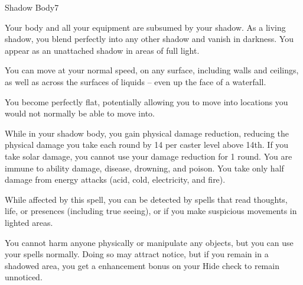 \begin{spellfooter}
\begin{spellsection}{Shadow Body}{7}
    \begin{spellheader}
        \begin{spelltargetinginfo}
        \end{spelltargetinginfo}
    \end{spellheader}
    \begin{spellcontent}
        \begin{spelleffects}
            \spelleffect Your body and all your equipment are subsumed by your shadow. As a living shadow, you blend perfectly into any other shadow and vanish in darkness. You appear as an unattached shadow in areas of full light.
            \par You can move at your normal speed, on any surface, including walls and ceilings, as well as across the surfaces of liquids -- even up the face of a waterfall.
            \par You become perfectly flat, potentially allowing you to move into locations you would not normally be able to move into.
            \par While in your shadow body, you gain physical damage reduction, reducing the physical damage you take each round by 14  per caster level above 14th. If you take solar damage, you cannot use your damage reduction for 1 round. You are immune to ability damage, disease, drowning, and poison. You take only half damage from energy attacks (acid, cold, electricity, and fire).
            \par While affected by this spell, you can be detected by spells that read thoughts, life, or presences (including true seeing), or if you make suspicious movements in lighted areas.
            \par You cannot harm anyone physically or manipulate any objects, but you can use your spells normally. Doing so may attract notice, but if you remain in a shadowed area, you get a  enhancement bonus on your Hide check to remain unnoticed.
            \spelldur \durmed \dismissable
        \end{spelleffects}
    \end{spellcontent}
    \begin{spellfooter}
    \end{spellfooter}
\end{spellsection}


\end{spellfooter}
